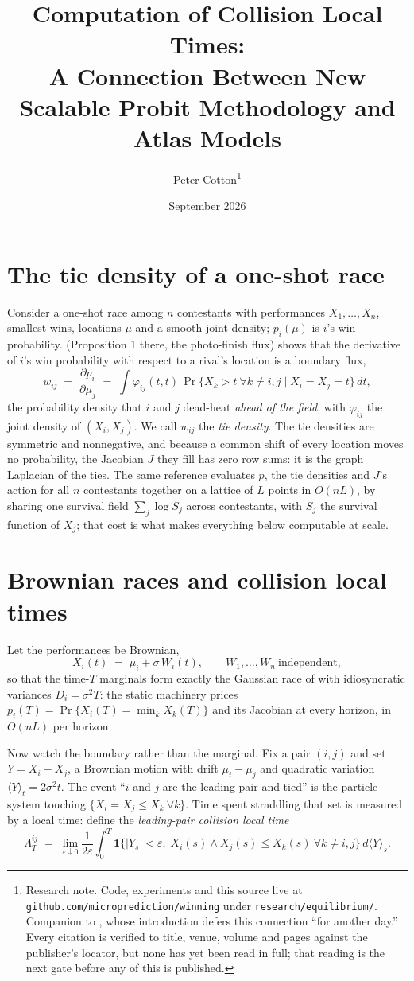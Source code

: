 \documentclass[11pt]{article}
\title{Computation of Collision Local Times:\\
A Connection Between New Scalable Probit Methodology and Atlas Models}
\author{Peter Cotton\thanks{Research note. Code, experiments and this
source live at \texttt{github.com/microprediction/winning} under
\texttt{research/equilibrium/}. Companion to \citet{cotton2026}, whose
introduction defers this connection ``for another day.'' Every citation
is verified to
title, venue, volume and pages against the publisher's locator, but
none has yet been read in full; that reading is the next gate before
any of this is published.}}
\date{September 2026}
\begin{document}
\maketitle

\section{The tie density of a one-shot race}

Consider a one-shot race among $n$ contestants with performances
$X_1,\dots,X_n$, smallest wins, locations $\mu$ and a smooth joint
density; $p_i(\mu)$ is $i$'s win probability. \citet{cotton2026}
(Proposition 1 there, the photo-finish flux) shows that the derivative
of $i$'s win probability with respect to a rival's location is a
boundary flux,
\begin{equation}\label{eq:tie}
w_{ij} \;=\; \frac{\partial p_i}{\partial \mu_j}
\;=\; \int \varphi_{ij}(t,t)\,
\Pr\{X_k > t\ \forall k\ne i,j \mid X_i=X_j=t\}\,dt ,
\end{equation}
the probability density that $i$ and $j$ dead-heat \emph{ahead of the
field}, with $\varphi_{ij}$ the joint density of $(X_i,X_j)$. We call
$w_{ij}$ the \emph{tie density}. The tie densities are symmetric and
nonnegative, and because a common shift of every location moves no
probability, the Jacobian $J$ they fill has zero row sums: it is the
graph Laplacian of the ties. The same reference evaluates $p$, the tie
densities and $J$'s action for all $n$ contestants together on a
lattice of $L$ points in $O(nL)$, by sharing one survival field
$\sum_j \log S_j$ across contestants, with $S_j$ the survival function
of $X_j$; that cost is what makes everything below computable at
scale.

\section{Brownian races and collision local times}

Let the performances be Brownian,
\[
X_i(t) \;=\; \mu_i + \sigma\,W_i(t),
\qquad W_1,\dots,W_n \ \text{independent},
\]
so that the time-$T$ marginals form exactly the Gaussian race of
\citet{cotton2026} with idiosyncratic variances $D_i = \sigma^2 T$: the
static machinery prices $p_i(T)=\Pr\{X_i(T)=\min_k X_k(T)\}$ and its
Jacobian at every horizon, in $O(nL)$ per horizon.

Now watch the boundary rather than the marginal. Fix a pair $(i,j)$ and
set $Y = X_i - X_j$, a Brownian motion with drift $\mu_i-\mu_j$ and
quadratic variation $\langle Y\rangle_t = 2\sigma^2 t$. The event
``$i$ and $j$ are the leading pair and tied'' is the particle system
touching $\{X_i = X_j \le X_k\ \forall k\}$. Time spent straddling that
set is measured by a local time: define the \emph{leading-pair
collision local time}
\[
\Lambda_T^{ij} \;=\;
\lim_{\varepsilon\downarrow 0}\frac{1}{2\varepsilon}
\int_0^T \mathbf 1\bigl\{|Y_s|<\varepsilon,\;
X_i(s)\wedge X_j(s) \le X_k(s)\ \forall k\ne i,j\bigr\}\,
d\langle Y\rangle_s .
\]
\end{document}
